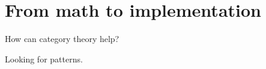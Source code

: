 
\section{From math to implementation}

How can category theory help?




Looking for patterns.








